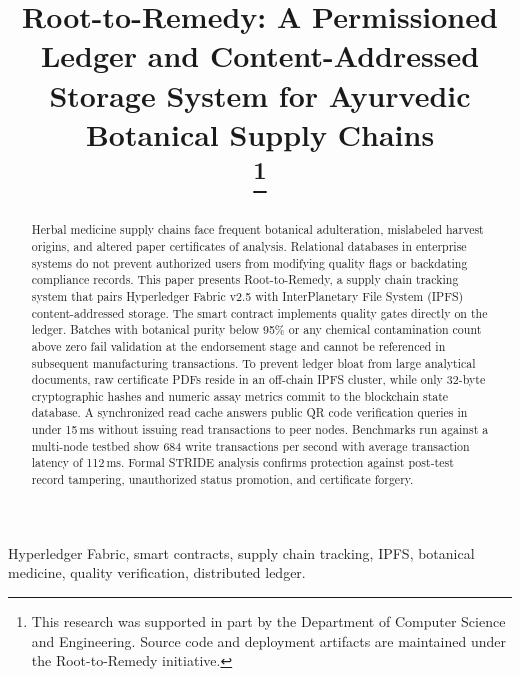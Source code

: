 \documentclass[conference]{IEEEtran}
\begin{document}
\title{Root-to-Remedy: A Permissioned Ledger and Content-Addressed Storage System for Ayurvedic Botanical Supply Chains\\
\thanks{This research was supported in part by the Department of Computer Science and Engineering. Source code and deployment artifacts are maintained under the Root-to-Remedy initiative.}
}

\author{
}

\maketitle

\begin{abstract}
Herbal medicine supply chains face frequent botanical adulteration, mislabeled harvest origins, and altered paper certificates of analysis. Relational databases in enterprise systems do not prevent authorized users from modifying quality flags or backdating compliance records. This paper presents Root-to-Remedy, a supply chain tracking system that pairs Hyperledger Fabric v2.5 with InterPlanetary File System (IPFS) content-addressed storage. The smart contract implements quality gates directly on the ledger. Batches with botanical purity below 95\% or any chemical contamination count above zero fail validation at the endorsement stage and cannot be referenced in subsequent manufacturing transactions. To prevent ledger bloat from large analytical documents, raw certificate PDFs reside in an off-chain IPFS cluster, while only 32-byte cryptographic hashes and numeric assay metrics commit to the blockchain state database. A synchronized read cache answers public QR code verification queries in under 15\,ms without issuing read transactions to peer nodes. Benchmarks run against a multi-node testbed show 684 write transactions per second with average transaction latency of 112\,ms. Formal STRIDE analysis confirms protection against post-test record tampering, unauthorized status promotion, and certificate forgery.
\end{abstract}

\begin{IEEEkeywords}
Hyperledger Fabric, smart contracts, supply chain tracking, IPFS, botanical medicine, quality verification, distributed ledger.
\end{IEEEkeywords}
\end{document}
